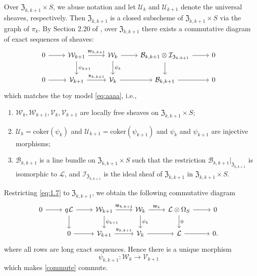 \documentclass{amsart}
\numberwithin{equation}{section}
\newcommand\mc{\mathcal}
\newcommand\mf{\mathfrak}
\theoremstyle{definition}
\theoremstyle{remark}
\begin{document}
Over $\mf{Z}_{k,k+1}\times S$, we abuse notation and let $\mc{U}_{k}$ and $\mc{U}_{k+1}$ denote the universal sheaves, respectively. Then $\mf{Z}_{k,k+1}$ is a closed subscheme of $\mf{Z}_{k,k+1}\times S$ via the graph of $\pi_k$. By Section 2.20 of \cite{neguct2018hecke}, over $\mf{Z}_{k,k+1}$ there exists a commutative diagram of exact sequences of sheaves:
  \begin{equation}
  \label{eq:1.7}
  \begin{tikzcd}
    0\ar{r} & \mathcal{W}_{k+1}\ar{r}{\mf{w}_{k,k+1}}\ar{d}{\psi_{k+1}} & \mathcal{W}_{k} \ar{r}\ar{d}{\psi_{k}} &  \mc{B}_{k,k+1}\otimes \mathcal{I}_{\mf{Z}_{k,k+1}} \ar{r}\ar{d} & 0 \\
    0\ar{r} & \mathcal{V}_{k+1}\ar{r}{\mf{v}_{k,k+1}} & \mathcal{V}_{k} \ar{r} & \mc{B}_{k,k+1} \ar{r} & 0
  \end{tikzcd}
\end{equation}
which matches the toy model \cref{eq:aaaa}, i.e.,
\begin{enumerate}
  \item $\mc{W}_{k},\mc{W}_{k+1},\mc{V}_{k},\mc{V}_{k+1}$ are locally free sheaves on $\mf{Z}_{k,k+1}\times S$;
  \item $\mc{U}_{k}=\mathrm{coker}(\psi_{k})$ and $\mc{U}_{k+1}=\mathrm{coker}(\psi_{k+1})$ and $\psi_{k}$ and $\psi_{k+1}$ are injective morphisms;
  \item $\mc{B}_{k,k+1}$ is a line bundle on $\mf{Z}_{k,k+1}\times S$ such that the restriction $\mc{B}_{k,k+1}|_{\mf{Z}_{k,k+1}}$ is isomorphic to $\mc{L}$, and $\mc{I}_{\mf{Z}_{k,k+1}}$ is the ideal sheaf of $\mf{Z}_{k,k+1}$ in $\mf{Z}_{k,k+1}\times S$.
\end{enumerate}
Restricting \cref{eq:1.7} to $\mf{Z}_{k,k+1}$, we obtain the following commutative diagram
 \begin{equation}
   \label{commute}
  \begin{tikzcd}
  0\ar{r}&  q\mc{L}\ar{d}\ar{r} & \mc{W}_{k+1} \ar{r}{\mf{w}_{k,k+1}} \ar{d}{\psi_{k+1}}& \mc{W}_{k}\ar{r}{\mf{w}_{k}} \ar{d}{\psi_{k}} & \mc{L}\otimes \Omega_S \ar{r} \ar{d}{0} & 0  \\
    & 0 \ar{r} & \mc{V}_{k+1} \ar{r}{\mf{v}_{k,k+1}} & \mc{V}_{k}\ar{r} & \mc{L} \ar{r}& 0.
  \end{tikzcd}
\end{equation}
where all rows are long exact sequences. Hence there is a unique morphism 
\begin{equation}
  \label{psik}
  \psi_{k,k+1}:\mc{W}_{k}\to \mc{V}_{k+1}
\end{equation}
which makes \cref{commute} commute.
\end{document}
